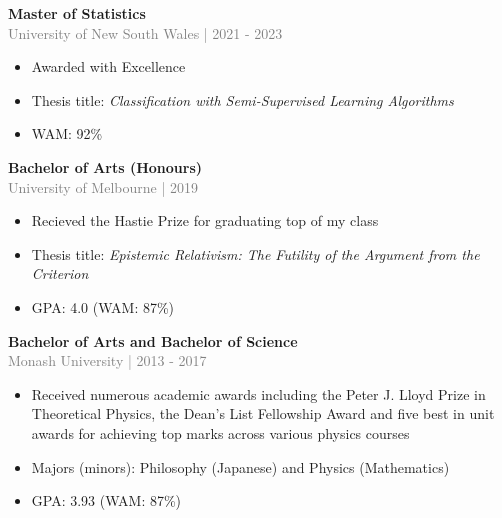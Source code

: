 \documentclass[10pt]{article}
\begin{document}
{\bf Master of Statistics} \\
\textcolor{gray}{University of New South Wales | 2021 - 2023} 
\begin{small}
\begin{itemize}
\item Awarded with Excellence

\item Thesis title: \emph{Classification with Semi-Supervised Learning Algorithms}

\item WAM: 92\%

\end{itemize}

\end{small}
\vspace{0.5cm}
{\bf Bachelor of Arts (Honours)} \\
\textcolor{gray}{University of Melbourne | 2019} 
\begin{small}
\begin{itemize}
\item Recieved the Hastie Prize for graduating top of my class

\item Thesis title: \emph{Epistemic Relativism: The Futility of the Argument from the Criterion}

\item GPA: 4.0 (WAM: 87\%)

\end{itemize}

\end{small}
\vspace{0.5cm}
{\bf Bachelor of Arts and Bachelor of Science} \\
\textcolor{gray}{Monash University | 2013 - 2017} 
\begin{small}
\begin{itemize}
\item Received numerous academic awards including the Peter J. Lloyd Prize in Theoretical Physics, the Dean's List Fellowship Award and five best in unit awards for achieving top marks across various physics courses

\item Majors (minors): Philosophy (Japanese) and Physics (Mathematics)

\item GPA: 3.93 (WAM: 87\%)

\end{itemize}

\end{small}
\end{document}
